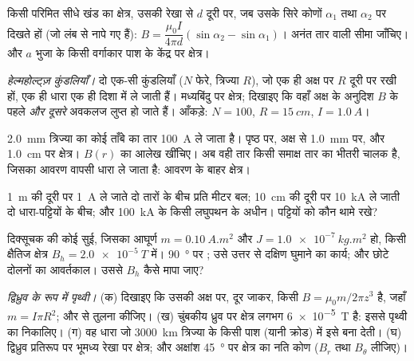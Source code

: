 \begin{exercise}[$\star\star$]\label{exo:b1:magnetostatics:5}
किसी परिमित सीधे खंड का क्षेत्र, उसकी रेखा से $d$ दूरी पर, जब उसके सिरे
कोणों $\alpha_1$ तथा $\alpha_2$ पर दिखते हों (जो लंब से नापे गए हैं):
$B = \dfrac{\mu_0I}{4\pi d}(\sin\alpha_2 - \sin\alpha_1)$। अनंत तार वाली सीमा
जाँचिए। और $a$ भुजा के किसी वर्गाकार पाश के केंद्र पर क्षेत्र।
\end{exercise}

\begin{exercise}[$\star\star$]\label{exo:b1:magnetostatics:6}
\emph{हेल्महोल्ट्ज़ कुंडलियाँ।} दो एक-सी कुंडलियाँ ($N$ फेरे, त्रिज्या
$R$), जो एक ही अक्ष पर $R$ दूरी पर रखी हों, एक ही धारा एक ही दिशा में ले जाती हैं।
मध्यबिंदु पर क्षेत्र; दिखाइए कि वहाँ अक्ष के अनुदिश $B$ के पहले
\emph{और दूसरे} अवकलज लुप्त हो जाते हैं। आँकड़े: $N = 100$,
$R = \qty{15}{cm}$, $I = \qty{1.0}{A}$।
\end{exercise}

\begin{exercise}[$\star\star$]\label{exo:b1:magnetostatics:7}
\qty{2.0}{mm} त्रिज्या का कोई ताँबे का तार \qty{100}{A} ले जाता है। पृष्ठ
पर, अक्ष से \qty{1.0}{mm} पर, और \qty{1.0}{cm} पर क्षेत्र। $B(r)$ का आलेख
खींचिए। अब वही तार किसी समाक्ष तार का भीतरी चालक है, जिसका आवरण वापसी धारा
ले जाता है: आवरण के बाहर क्षेत्र।
\end{exercise}

\begin{exercise}[$\star\star$]\label{exo:b1:magnetostatics:8}
\qty{1}{m} की दूरी पर \qty{1}{A} ले जाते दो तारों के बीच प्रति मीटर बल;
\qty{10}{cm} की दूरी पर \qty{10}{kA} ले जाती दो धारा-पट्टियों के बीच; और
\qty{100}{kA} के किसी लघुपथन के अधीन। पट्टियों को कौन थामे रखे?
\end{exercise}

\begin{exercise}[$\star\star$]\label{exo:b1:magnetostatics:9}
दिक्सूचक की कोई सुई, जिसका आघूर्ण $m = \qty{0.10}{A.m^2}$ और 
$J = \qty{1.0e-7}{kg.m^2}$ हो, किसी क्षैतिज क्षेत्र $B_h = \qty{2.0e-5}{T}$ में।
\qty{90}{\degree} पर ; उसे उत्तर से दक्षिण घुमाने का कार्य; और छोटे
दोलनों का आवर्तकाल। उससे $B_h$ कैसे मापा जाए?
\end{exercise}

\begin{exercise}[$\star\star\star$]\label{exo:b1:magnetostatics:10}
\emph{द्विध्रुव के रूप में पृथ्वी।} (क) दिखाइए कि उसकी अक्ष पर, दूर जाकर,
किसी  $B = \mu_0m/2\pi z^3$ है, जहाँ $m = I\pi R^2$; और  से तुलना कीजिए। (ख) चुंबकीय ध्रुव पर क्षेत्र लगभग
\qty{6e-5}{T} है: इससे पृथ्वी का  निकालिए। (ग) वह धारा जो
\qty{3000}{km} त्रिज्या के किसी पाश (यानी क्रोड) में इसे बना देती। (घ)
द्विध्रुव प्रतिरूप पर भूमध्य रेखा पर क्षेत्र; और अक्षांश
\qty{45}{\degree} पर क्षेत्र का नति कोण ($B_r$ तथा $B_\theta$ लीजिए)।
\end{exercise}

